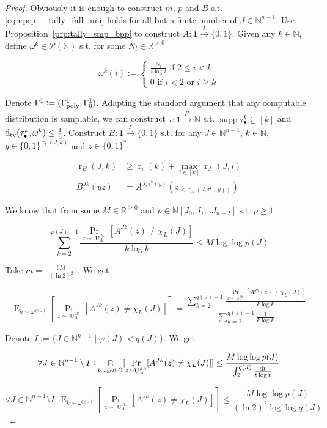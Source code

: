 \documentclass{article}
\numberwithin{equation}{section}
\theoremstyle{definition}
\theoremstyle{plain}
\newcommand{\Bool}{\{0,1\}}
\newcommand{\Words}{{\Bool^*}}
\DeclareMathOperator{\Supp}{supp}
\DeclareMathOperator{\Prb}{Pr}
\DeclareMathOperator{\E}{E}
\DeclareMathOperator{\R}{r}
\DeclareMathOperator{\Un}{U}
\newcommand{\Dtv}{\operatorname{d}_{\textnormal{tv}}}
\newcommand{\Nats}{\mathbb{N}}
\newcommand{\Reals}{\mathbb{R}}
\newcommand{\NatPolyJ}{\Nats[J_0, J_1 \ldots J_{n-2}]}
\newcommand{\Ceil}[1]{\lceil #1 \rceil}
\newcommand{\GammaPoly}{\Gamma_{\textnormal{poly}}}
\newcommand{\Scheme}{\xrightarrow{\Gamma}}
\begin{document}
\begin{proof}

Obviously it is enough to construct ${m}$, ${p}$ and ${B}$ s.t. \ref{eqn:prp__tally_fall_uni} holds for all but a finite number of ${J \in \Nats^{n-1}}$. Use Proposition~\ref{prp:tally_smp_bpp} to construct ${A: \bm{1} \Scheme \Bool}$. Given any ${k \in \Nats}$, define ${\omega^k \in \mathcal{P}(\Nats)}$ s.t. for some ${N_l \in \Reals^{>0}}$

\[\omega^k(i):=\begin{cases}\frac{N_l}{i \log i} \text{ if } 2 \leq i < k\\0 \text{ if } i < 2 \text { or } i \geq k\end{cases}\]

Denote ${\Gamma^1:=(\GammaPoly^1,\Gamma_0^1)}$. Adapting the standard argument that any computable distribution is samplable, we can construct ${\tau: \bm{1} \xrightarrow{\Gamma^1} \Nats}$ s.t. ${\Supp \tau_\bullet^{k} \subseteq [k]}$ and ${\Dtv(\tau_\bullet^{k}, \omega^k) \leq \frac{1}{6}}$. Construct ${B: \bm{1} \Scheme \Bool}$ s.t. for any ${J \in \Nats^{n-1}}$, ${k \in \Nats}$, ${y \in \Bool^{\R_\tau(J,k)}}$ and ${z \in \Words}$

\begin{align*}
\R_B(J,k) &\geq \R_\tau(k) + \max_{i \in [k]} \R_A(J,i) \\
B^{Jk}(y z) &= A^{J,\tau^{k}(y)}(z_{<\R_A(J,\tau^{k}(y))}) 
\end{align*}

We know that from some ${M \in \Reals^{\geq 0}}$ and ${p \in \NatPolyJ}$ s.t. ${p \geq 1}$

\[\sum_{k=2}^{\varphi(J)-1} \frac{\Prb_{z \sim \Un_A^{Jk}}[A^{Jk}(z) \neq \chi_L(J)]}{k \log k} \leq M \log \log p(J)\]

Take ${m = \Ceil{\frac{6M}{(\ln 2)^2}}}$. We get

\[\E_{k \sim \omega^{q(J)}}[\Prb_{z \sim \Un_A^{Jk}}[A^{Jk}(z) \neq \chi_L(J)]]=\frac{\sum_{k=2}^{q(J)-1} \frac{\Prb_{z \sim \Un_A^{Jk}}[A^{Jk}(z) \neq \chi_L(J)]}{k \log k}}{\sum_{k=2}^{q(J)-1} \frac{1}{k \log k}}\]

Denote $I:=\{J \in \Nats^{n-1} \mid \varphi(J) < q(J)\}$. We get

\[\forall J \in \Nats^{n-1} \setminus I: \E_{k \sim \omega^{q(J)}}[\Prb_{z \sim \Un_A^{Jk}}[A^{Jk}(z) \neq \chi_L(J)]] \leq \frac{M \log \log p(J)}{\int_2^{q(J)} \frac{\dif t}{t \log t}}\]

\[\forall J \in \Nats^{n-1} \setminus I:\E_{k \sim \omega^{q(J)}}[\Prb_{z \sim \Un_A^{Jk}}[A^{Jk}(z) \neq \chi_L(J)]] \leq \frac{M \log \log p(J)}{(\ln 2)^2 \log \log q(J)}\]


\end{proof}
\end{document}
